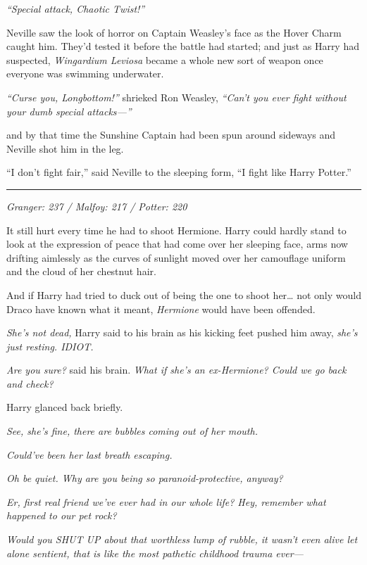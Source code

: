 \emph{``Special attack, Chaotic Twist!''}

Neville saw the look of horror on Captain Weasley's face as the Hover
Charm caught him. They'd tested it before the battle had started; and
just as Harry had suspected, \emph{Wingardium Leviosa} became a whole
new sort of weapon once everyone was swimming underwater.

\emph{``Curse you, Longbottom!''} shrieked Ron Weasley, \emph{``Can't
you ever fight without your dumb special attacks---''}

and by that time the Sunshine Captain had been spun around sideways and
Neville shot him in the leg.

``I don't fight fair,'' said Neville to the sleeping form, ``I fight
like Harry Potter.''

\begin{center}\rule{3in}{0.4pt}\end{center}

\emph{Granger: 237 / Malfoy: 217 / Potter: 220}

It still hurt every time he had to shoot Hermione. Harry could hardly
stand to look at the expression of peace that had come over her sleeping
face, arms now drifting aimlessly as the curves of sunlight moved over
her camouflage uniform and the cloud of her chestnut hair.

And if Harry had tried to duck out of being the one to shoot her\ldots{}
not only would Draco have known what it meant, \emph{Hermione} would
have been offended.

\emph{She's not dead,} Harry said to his brain as his kicking feet
pushed him away, \emph{she's just resting. IDIOT.}

\emph{Are you sure?} said his brain. \emph{What if she's an ex-Hermione?
Could we go back and check?}

Harry glanced back briefly.

\emph{See, she's fine, there are bubbles coming out of her mouth.}

\emph{Could've been her last breath escaping.}

\emph{Oh be quiet. Why are you being so paranoid-protective, anyway?}

\emph{Er, first real friend we've ever had in our whole life? Hey,
remember what happened to our pet rock?}

\emph{Would you SHUT UP about that worthless lump of rubble, it wasn't
even alive let alone sentient, that is like the most pathetic childhood
trauma ever---}

